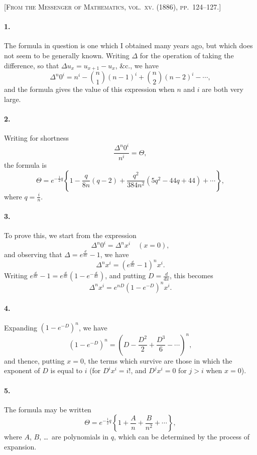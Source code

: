 \documentclass[11pt,a4paper]{book}
\begin{document}
\noindent\textsc{[From the Messenger of Mathematics, vol.~xv. (1886), pp.~124--127.]}

\smallskip

\paragraph{1.} The formula in question is one which I obtained many years ago, but which does not seem to be generally known. Writing $\Delta$ for the operation of taking the difference, so that $\Delta u_{x} = u_{x+1} - u_{x}$, \&c., we have
\[
\Delta^{n} 0^{i} = n^{i} - \binom{n}{1}(n-1)^{i} + \binom{n}{2}(n-2)^{i} - \cdots,
\]
and the formula gives the value of this expression when $n$ and $i$ are both very large.

\paragraph{2.} Writing for shortness
\[
\frac{\Delta^{n} 0^{i}}{n^{i}} = \Theta,
\]
the formula is
\[
\Theta = e^{-\frac{1}{2}q}\left\{1 - \frac{q}{8n}(q - 2) + \frac{q^{2}}{384n^{2}}(5q^{2} - 44q + 44) + \cdots\right\},
\]
where $q = \frac{i}{n}$.

\paragraph{3.} To prove this, we start from the expression
\[
\Delta^{n} 0^{i} = \Delta^{n} x^{i} \quad (x = 0),
\]
and observing that $\Delta = e^{\frac{d}{dx}} - 1$, we have
\[
\Delta^{n} x^{i} = (e^{\frac{d}{dx}} - 1)^{n} x^{i}.
\]
Writing $e^{\frac{d}{dx}} - 1 = e^{\frac{d}{dx}}(1 - e^{-\frac{d}{dx}})$, and putting $D = \frac{d}{dx}$, this becomes
\[
\Delta^{n} x^{i} = e^{nD}(1 - e^{-D})^{n} x^{i}.
\]

\paragraph{4.} Expanding $(1 - e^{-D})^{n}$, we have
\[
(1 - e^{-D})^{n} = \left(D - \frac{D^{2}}{2} + \frac{D^{3}}{6} - \cdots\right)^{n},
\]
and thence, putting $x = 0$, the terms which survive are those in which the exponent of $D$ is equal to $i$ (for $D^{i}x^{i} = i!$, and $D^{j}x^{i} = 0$ for $j > i$ when $x = 0$).

\paragraph{5.} The formula may be written
\[
\Theta = e^{-\frac{1}{2}q}\left\{1 + \frac{A}{n} + \frac{B}{n^{2}} + \cdots\right\},
\]
where $A$, $B$, \ldots\ are polynomials in $q$, which can be determined by the process of expansion.
\end{document}
